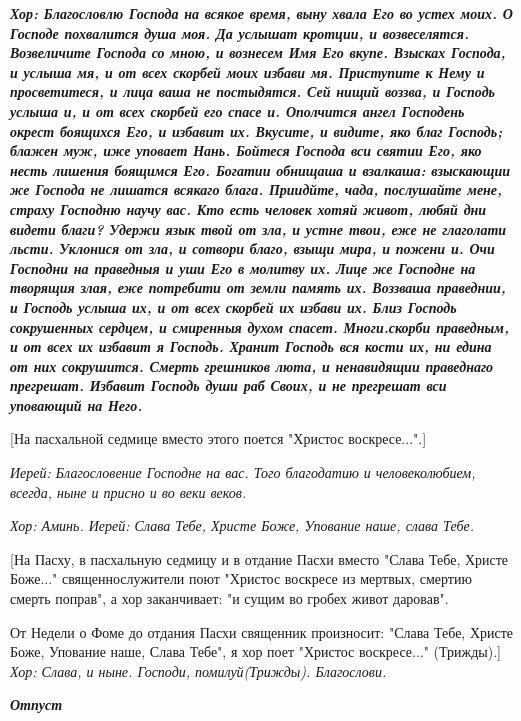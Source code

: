 \bfseries  \normalfont{}\itshape  Хор:\normalfont{} Благословлю Господа на всякое время, выну хвала Его во устех моих. О Господе похвалится душа моя. Да услышат кротции, и возвеселятся. Возвеличите Господа со мною, и вознесем Имя Его вкупе. Взысках Господа, и услыша мя, и от всех скорбей моих избави мя. Приступите к Нему и просветитеся, и лица ваша не постыдятся. Сей нищий воззва, и Господь услыша и, и от всех скорбей его спасе и. Ополчится ангел Господень окрест боящихся Его, и избавит их. Вкусите, и видите, яко благ Господь; блажен муж, иже уповает Нань. Бойтеся Господа вси святии Его, яко несть лишения боящимся Его. Богатии обнищаша и взалкаша: взыскающии же Господа не лишатся всякаго блага. Приидйте, чада, послушайте мене, страху Господню научу вас. Кто есть человек хотяй живот, любяй дни видети благи? Удержи язык твой от зла, и устне твои, еже не глаголати льсти. Уклонися от зла, и сотвори благо, взыщи мира, и пожени и. Очи Господни на праведныя и уши Его в молитву их. Лице же Господне на творящия злая, еже потребити от земли память их. Воззваша праведнии, и Господь услыша их, и от всех скорбей их избави их. Близ Господь сокрушенных сердцем, и смиренныя духом спасет. Многи.скорби праведным, и от всех их избавит я Господь. Хранит Господь вся кости их, ни едина от них сокрушится. Смерть грешников люта, и ненавидящии праведнаго прегрешат. Избавит Господь души раб Своих, и не прегрешат вси уповающий на Него.


  [На пасхальной седмице вместо этого поется "Христос воскресе...".]


 \itshape  Иерей:\normalfont{} Благословение Господне на вас. Того благодатию и человеколюбием, всегда, ныне и присно и во веки веков.


\itshape  Хор:\normalfont{} Аминь. \itshape  Иерей:\normalfont{} Слава Тебе, Христе Боже, Упование наше, слава Тебе.


    [На Пасху, в пасхальную седмицу и в отдание Пасхи вместо "Слава Тебе, Христе Боже..." священнослужители поют "Христос воскресе из мертвых, смертию смерть поправ", а хор заканчивает: "и сущим во гробех живот даровав". 


    От Недели о Фоме до отдания Пасхи священник произносит: "Слава Тебе, Христе Боже, Упование наше, Слава Тебе", я хор поет "Христос воскресе..." (Трижды).] \itshape  Хор: Слава, и ныне.\normalfont{} Господи, помилуй\itshape  (Трижды).\normalfont{} Благослови. 


\medskip


 \bfseries \itshape  Отпуст \normalfont{}\normalfont{}


